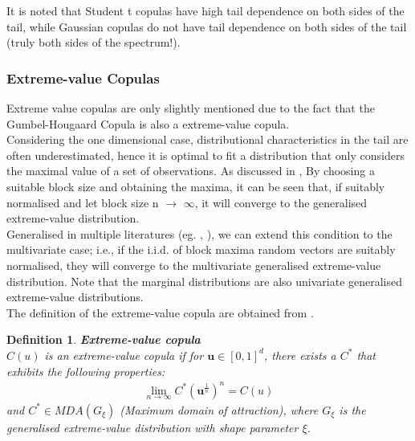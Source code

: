\documentclass[12pt]{report}
\newtheorem{definition}{Definition}[subsection]
\newcommand{\1}{\mathbf{1}}
\begin{document}
It is noted that Student t copulas have high tail dependence on both sides of the tail, while Gaussian copulas do not have tail dependence on both sides of the tail (truly both sides of the spectrum!).\\

\subsubsection{Extreme-value Copulas}
\vspace{0.5cm}

Extreme value copulas are only slightly mentioned due to the fact that the Gumbel-Hougaard Copula is also a extreme-value copula.\\
\vspace{0.5cm}
Considering the one dimensional case, distributional characteristics in the tail are often underestimated, hence it is optimal to fit a distribution that only considers the maximal value of a set of observations. As discussed in \cite{ModellingExtremalEventsForInsuranceandFinance}, By choosing a suitable block size and obtaining the maxima, it can be seen that, if suitably normalised and let block size n $\rightarrow$ $\infty$, it will converge to the generalised extreme-value distribution.\\
\vspace{0.5cm}
Generalised in multiple literatures (eg. \cite{EVTAnIntro}, \cite{HofertBook}), we can extend this condition to the multivariate case; i.e., if the i.i.d. of block maxima random vectors are suitably normalised, they will converge to the multivariate generalised extreme-value distribution. Note that the marginal distributions are also univariate generalised extreme-value distributions.  \\
\vspace{0.5cm}
The definition of the extreme-value copula are obtained from \cite{HofertBook}.

\begin{definition}\label{ExtremeValueDefinition}
\textit{\normalfont\parencite{HofertBook}} \:\textbf{Extreme-value copula} \\

$C(u)$ is an extreme-value copula if for $\boldsymbol{u} \in [0,1]^{d}$, there exists a $C^{*}$ that exhibits the following properties: 
\begin{align*}
\lim_{n \rightarrow \infty} C^{*}(\boldsymbol{u}^{\frac{1}{n}})^{n} = C(u)
\end{align*}
and $C^{*} \in MDA(G_{\xi})$ (Maximum domain of attraction), where $G_{\xi}$ is the generalised extreme-value distribution with shape parameter $\xi$.
\end{definition}
\end{document}
